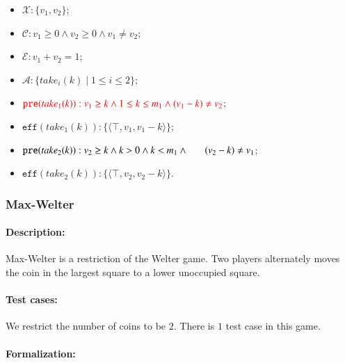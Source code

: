 \documentclass[review]{elsarticle}
\newcommand{\set}[1]{\{ #1 \}}
\newcommand{\tuple}[1]{\langle {#1} \rangle}
\newcommand{\true}{\top}
\newcommand{\statevar}{\mathcal{X}}
\newcommand{\act}{\mathcal{A}}
\newcommand{\constraint}{\mathcal{C}}
\newcommand{\estate}{\mathcal{E}}
\newcommand{\pre}{\mathtt{pre}}
\newcommand{\eff}{\mathtt{eff}}
\begin{document}
\begin{itemize}
	\item $\statevar: \set{v_1, v_2}$;
	\item $\constraint: v_1 \ge 0 \wedge v_2 \ge 0  \wedge v_1 \neq v_2$;
	\item $\estate: v_1+v_2= 1 $;
	\item $\act:\set{take_i(k){\mid}1\le i \le2}$;
	\item $\textcolor{red}{\pre(take_1(k)) :  v_1 \ge k \wedge 1 \le k \le m_1 \wedge (v_1-k) \neq v_2}$;
	\item $\eff(take_1(k)) : \set{\tuple{\true,  v_1,  v_1 - k}}$;
	\item $\pre(take_2(k)) :  v_2 \ge k \wedge k > 0 \wedge k < m_1 \wedge \\\\ \hspace*{6mm}
	(v_2-k) \neq v_1 $;
	
	\item $\eff(take_2(k)) : \set{\tuple{\true,  v_2,  v_2 - k}}$.
\end{itemize}




\subsubsection{Max-Welter \protect\cite{Ho2014}}

\paragraph{Description:} 
Max-Welter is a restriction of the Welter game.
Two players alternately moves the coin in the largest square to a lower unoccupied square. 

\paragraph{Test cases:}
We restrict the number of coins to be $2$. 
There is $1$ test case in this game.

\paragraph{Formalization:}
\end{document}
